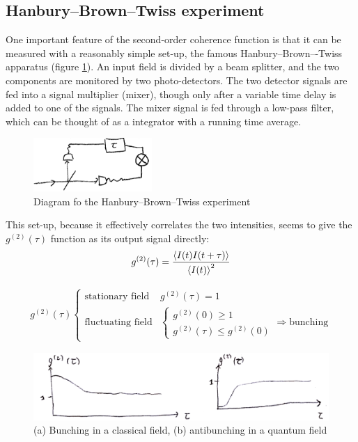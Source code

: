 \subsection{Hanbury--Brown--Twiss experiment}
One important feature of the second-order coherence function is that it can be measured with a reasonably simple set-up, the famous Hanbury--Brown–-Twiss apparatus (figure \ref{fig:hbt-experiment}). An input field is divided by a beam splitter, and the two components are monitored by two photo-detectors. The two detector signals are fed into a signal multiplier (mixer), though only after a variable time delay is added to one of the signals. The mixer signal is fed through a low-pass filter, which can be thought of as a integrator with a running time average.
\begin{figure}[H]
	\centering
	\includegraphics[width=0.4\textwidth]{./images/1-hbt-experiment}
	\caption{Diagram fo the Hanbury--Brown--Twiss experiment}
	\label{fig:hbt-experiment}
\end{figure}
This set-up, because it effectively correlates the two intensities, seems to give the $g^{(2)}(\tau)$ function as its output signal directly:
\begin{align}
	g^{(2)}(\tau) = \frac{\ev{I(t) I(t + \tau)}}{\ev{I(t)}^{2}}
\end{align}

\begin{align*}
	g^{(2)}(\tau)
	\begin{cases}
		\text{stationary field} & g^{(2)} (\tau) = 1 \\
		\text{fluctuating field} &
		\begin{cases}
			g^{(2)} (0) \geq 1 \\
			g^{(2)} (\tau) \leq g^{(2)} (0)
		\end{cases}
		\Rightarrow \text{bunching}
	\end{cases}
\end{align*}

\begin{figure}[H]
	\centering
	\includegraphics[width=\textwidth]{./images/1-bunching}
	\caption{(a) Bunching in a classical field, (b) antibunching in a quantum field}
	\label{fig:bunching}
\end{figure}
